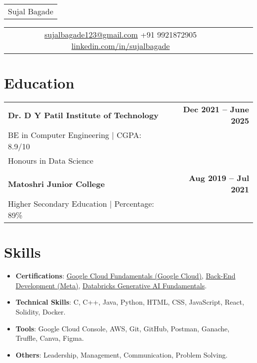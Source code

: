 \documentclass[a4paper,10pt]{article}
\begin{document}
\fontsize{10}{12}\selectfont
\pagestyle{empty}

\begin{tabularx}{\linewidth}{@{}C@{}}
\Huge{Sujal Bagade} \\[6pt]
\end{tabularx}

\begin{tabularx}{\linewidth}{@{}C@{}C@{}C@{}}
\href{mailto:sujalbagade123@gmail.com}{\raisebox{-0.05\height}{\faEnvelope} sujalbagade123@gmail.com} \hspace{0.2cm}
\raisebox{-0.05\height}{\faMobile} +91 9921872905 \hspace{0.2cm}
\href{https://www.linkedin.com/in/sujalbagade}{\raisebox{-0.05\height}{\faLinkedin} linkedin.com/in/sujalbagade}
\end{tabularx}

\section{\textbf{Education}}
\begin{tabularx}{\linewidth}{@{}X r@{}}
\textbf{Dr. D Y Patil Institute of Technology} & \textbf{Dec 2021 -- June 2025} \\
BE in Computer Engineering | CGPA: 8.9/10 \\
Honours in Data Science \\
\\
\textbf{Matoshri Junior College} & \textbf{Aug 2019 -- Jul 2021} \\
Higher Secondary Education | Percentage: 89\% \\
\end{tabularx}

\section{\textbf{Skills}}
\begin{itemize}[nosep,leftmargin=*]
    \item \textbf{Certifications}: 
    \href{https://www.coursera.org/account/accomplishments/verify/FV8DSDL7DVVZ}{Google Cloud Fundamentals (Google Cloud)}, 
    \href{https://www.coursera.org/account/accomplishments/verify/9S7N4TJ68C98}{Back-End Development (Meta)}, 
    \href{https://credentials.databricks.com/c4992167-4627-41fd-998f-1a64555d43ff#acc.gc3NZh2P}{Databricks Generative AI Fundamentals}.
    \item \textbf{Technical Skills}: C, C++, Java, Python, HTML, CSS, JavaScript, React, Solidity, Docker.
    \item \textbf{Tools}: Google Cloud Console, AWS, Git, GitHub, Postman, Ganache, Truffle, Canva, Figma.
    \item \textbf{Others}: Leadership, Management, Communication, Problem Solving.
\end{itemize}
\end{document}
